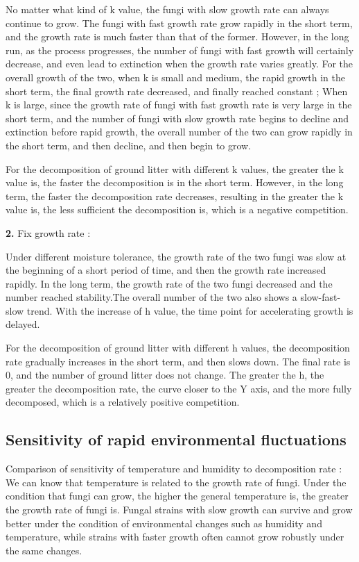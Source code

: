\documentclass{mcmthesis}
\begin{document}
No matter what kind of k value, the fungi with slow growth rate can always continue to grow. The fungi with fast growth rate grow rapidly in the short term, and the growth rate is much faster than that of the former. However, in the long run, as the process progresses, the number of fungi with fast growth will certainly decrease, and even lead to extinction when the growth rate varies greatly. For the overall growth of the two, when k is small and medium, the rapid growth in the short term, the final growth rate decreased, and finally reached constant ; When k is large, since the growth rate of fungi with fast growth rate is very large in the short term, and the number of fungi with slow growth rate begins to decline and extinction before rapid growth, the overall number of the two can grow rapidly in the short term, and then decline, and then begin to grow.      

For the decomposition of ground litter with different k values, the greater the k value is, the faster the decomposition is in the short term. However, in the long term, the faster the decomposition rate decreases, resulting in the greater the k value is, the less sufficient the decomposition is, which is a negative competition.

\textbf{2.} Fix growth rate :       

Under different moisture tolerance, the growth rate of the two fungi was slow at the beginning of a short period of time, and then the growth rate increased rapidly. In the long term, the growth rate of the two fungi decreased and the number reached stability.The overall number of the two also shows a slow-fast-slow trend. With the increase of h value, the time point for accelerating growth is delayed.       

For the decomposition of ground litter with different h values, the decomposition rate gradually increases in the short term, and then slows down. The final rate is 0, and the number of ground litter does not change. The greater the h, the greater the decomposition rate, the curve closer to the Y axis, and the more fully decomposed, which is a relatively positive competition.
\subsection{Sensitivity of rapid environmental fluctuations}
Comparison of sensitivity of temperature and humidity to decomposition rate :   We can know that temperature is related to the growth rate of fungi. Under the condition that fungi can grow, the higher the general temperature is, the greater the growth rate of fungi is. Fungal strains with slow growth can survive and grow better under the condition of environmental changes such as humidity and temperature, while strains with faster growth often cannot grow robustly under the same changes.      
\end{document}
